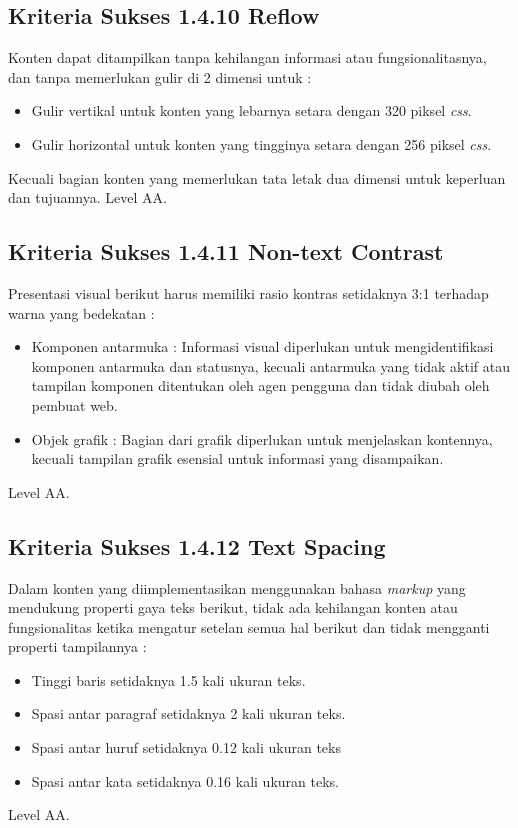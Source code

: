 \subsection{Kriteria Sukses 1.4.10 Reflow}
\label{sec:kriteria_1.4.10}
Konten dapat ditampilkan tanpa kehilangan informasi atau fungsionalitasnya, dan tanpa memerlukan gulir di 2 dimensi untuk :

\begin{itemize}
	\item Gulir vertikal untuk konten yang lebarnya setara dengan 320 piksel \textit{css}.
	\item Gulir horizontal untuk konten yang tingginya setara dengan 256 piksel \textit{css}.
\end{itemize}

Kecuali bagian konten yang memerlukan tata letak dua dimensi untuk keperluan dan tujuannya.
Level AA.

\subsection{Kriteria Sukses 1.4.11 Non-text Contrast}
\label{sec:kriteria_1.4.11}
Presentasi visual berikut harus memiliki rasio kontras setidaknya 3:1 terhadap warna yang bedekatan :

\begin{itemize}
	\item Komponen antarmuka : Informasi visual diperlukan untuk mengidentifikasi komponen antarmuka dan statusnya, kecuali antarmuka yang tidak aktif atau tampilan komponen ditentukan oleh agen pengguna dan tidak diubah oleh pembuat web.
	\item Objek grafik : Bagian dari grafik diperlukan untuk menjelaskan kontennya, kecuali tampilan grafik esensial untuk informasi yang disampaikan.
\end{itemize}

Level AA.

\subsection{Kriteria Sukses 1.4.12 Text Spacing}
\label{sec:kriteria_1.4.12}
Dalam konten yang diimplementasikan menggunakan bahasa \textit{markup} yang mendukung properti gaya teks berikut, tidak ada kehilangan konten atau fungsionalitas ketika mengatur setelan semua hal berikut dan tidak mengganti properti tampilannya : 

\begin{itemize}
	\item Tinggi baris setidaknya 1.5 kali ukuran teks.
	\item Spasi antar paragraf setidaknya 2 kali ukuran teks.
	\item Spasi antar huruf setidaknya 0.12 kali ukuran teks
	\item Spasi antar kata setidaknya 0.16 kali ukuran teks.
\end{itemize}
Level AA.

